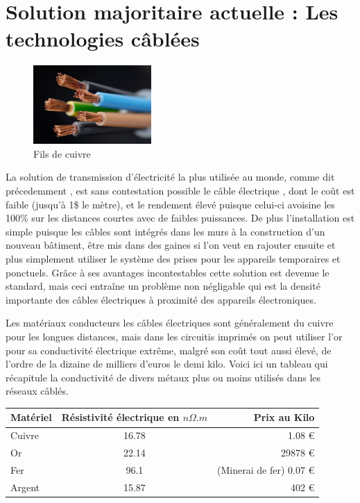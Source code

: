 \documentclass[12pt]{report}
\begin{document}
\section{Solution majoritaire actuelle : Les technologies câblées}
\begin{figure}
  \begin{center}
    \includegraphics[width=0.4\textwidth]{copperWire}
  \end{center}
  \caption{Fils de cuivre}
\end{figure} La solution de transmission d'électricité la plus utilisée au monde, comme dit précedemment , est sans contestation possible le câble électrique , dont le coût est faible (jusqu'à 1\$ le mètre), et le rendement élevé puisque celui-ci avoisine les 100\% sur les distances courtes avec de faibles puissances. De plus l'installation est simple puisque les câbles sont intégrés dans les murs à la construction d'un nouveau bâtiment, être mis dans des gaines si l'on veut en rajouter ensuite et plus simplement utiliser le système des prises pour les appareils temporaires et ponctuels. Grâce à ses avantages incontestables cette solution est devenue le standard, mais ceci entraîne un problème non négligable qui est la densité importante des câbles électriques à proximité des appareils électroniques.
	
	Les matériaux conducteurs les câbles électriques sont généralement du cuivre pour les longues distances, mais dans les circuitis imprimés on peut utiliser l'or pour sa conductivité électrique extrême, malgré son coût tout aussi élevé, de l'ordre de la dizaine de milliers d'euros le demi kilo. Voici ici un tableau qui récapitule la conductivité de divers métaux plus ou moins utilisés dans les réseaux câblés.

\begin{center}
\begin{tabular}{| l | c | r |}
	\hline
	Matériel & Résistivité électrique en \( n\Omega .m \)& Prix au Kilo \\
	\hline
	Cuivre & 16.78 & 1.08 \euro{}  \\
	Or & 22.14 & 29878 \euro{}  \\
	Fer & 96.1 & (Minerai de fer) 0.07 \euro{}  \\
	Argent & 15.87 & 402 \euro{}  \\
	\hline
\end{tabular}
\end{center}
\end{document}
